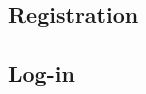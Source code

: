\begin{comment}
  \newpage
  \subsection{Sample section}
  This section is here just to provide a standard template for the system functions, before the functional requirements enumeration a brief description may be useful
  \subsubsection{Functional requirements}
  \subsubsection{Scenario 1}
  \subsubsection{Scenario 2}
  \subsubsection{Scenario n}
  \subsubsection{Use-case table}
  \subsubsection{Use-case diagram}
  \subsubsection{Activity/State-chart diagram}
  \subsubsection{Sequence diagram}
  \subsubsection{Mockups}
\end{comment}

\newpage
\subsection{Registration}
  

\newpage
\subsection{Log-in}
  

